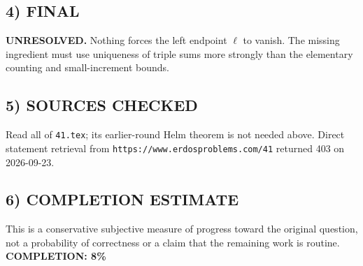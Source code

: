 \subsection{4) FINAL}
\textbf{UNRESOLVED.}
Nothing forces the left endpoint $\ell$ to vanish. The missing ingredient must use uniqueness of triple sums more strongly than the elementary counting and small-increment bounds.
\subsection{5) SOURCES CHECKED}
Read all of \texttt{41.tex}; its earlier-round Helm theorem is not needed above. Direct statement retrieval from \texttt{https://www.erdosproblems.com/41} returned 403 on 2026-09-23.
\subsection{6) COMPLETION ESTIMATE}
This is a conservative subjective measure of progress toward the original question, not a probability of correctness or a claim that the remaining work is routine.
\textbf{COMPLETION: 8\%}
